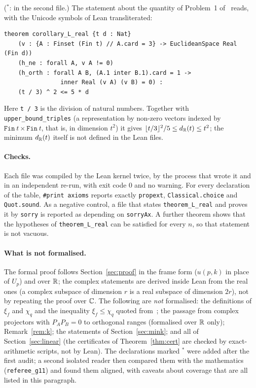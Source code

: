 ($^{\ast}$: in the second file.) The statement about the quantity of Problem~1 of~\cite{HI} reads, with the
Unicode symbols of Lean transliterated:
\begin{verbatim}
theorem corollary_L_real {t d : Nat}
    (v : {A : Finset (Fin t) // A.card = 3} -> EuclideanSpace Real (Fin d))
    (h_ne : forall A, v A != 0)
    (h_orth : forall A B, (A.1 inter B.1).card = 1 ->
                inner Real (v A) (v B) = 0) :
    (t / 3) ^ 2 <= 5 * d
\end{verbatim}
Here \texttt{t / 3} is the division of natural numbers. Together with \texttt{upper\_bound\_triples} (a
representation by non-zero vectors indexed by $\texttt{Fin}\ t\times\texttt{Fin}\ t$, that is, in dimension
$t^2$) it gives $\lfloor t/3\rfloor^2/5\le d_{\mathbb{R}}(t)\le t^2$; the minimum $d_{\mathbb{R}}(t)$ itself is not defined in the Lean
files.

\paragraph{Checks.} Each file was compiled by the Lean kernel twice, by the process that wrote it and in an
independent re-run, with exit code $0$ and no warning. For every declaration of the table,
\texttt{\#print axioms} reports exactly \texttt{propext}, \texttt{Classical.choice} and \texttt{Quot.sound}.
As a negative control, a file that states \texttt{theorem\_L\_real} and proves it by \texttt{sorry} is
reported as depending on \texttt{sorryAx}. A further theorem shows that the hypotheses of
\texttt{theorem\_L\_real} can be satisfied for every $n$, so that statement is not vacuous.


\paragraph{What is not formalised.} The formal proof follows Section~\ref{sec:proof} in the frame form
($u(p,k)$ in place of $U_p$) and over $\mathbb{R}$; the complex statements are derived inside Lean from the real ones
(a complex subspace of dimension $r$ is a real subspace of dimension $2r$), not by repeating the proof over
$\mathbb{C}$. The following are \emph{not} formalised: the definitions of $\xi_f$ and $\chi_q$ and the inequality
$\xi_f\le\chi_q$ quoted from~\cite{MR}; the passage from complex projectors with $P_AP_B=0$ to orthogonal
ranges (formalised over $\mathbb{R}$ only); Remark~\ref{rem:k}; the statements of Section~\ref{sec:mink}; and all of
Section~\ref{sec:linear} (the certificates of Theorem~\ref{thm:cert} are checked by exact-arithmetic scripts,
not by Lean). The declarations marked $^{\ast}$ were added after the first audit; a second isolated
reader then compared them with the mathematics (\texttt{referee\_g11}) and found them aligned, with caveats
about coverage that are all listed in this paragraph.

